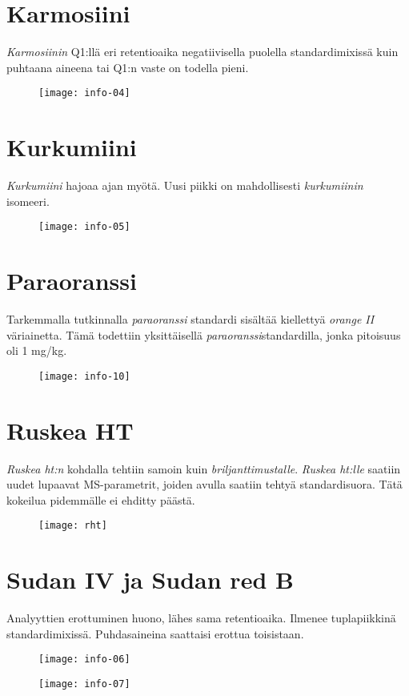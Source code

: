 \section{Karmosiini}
\textit{Karmosiinin} Q1:llä eri retentioaika negatiivisella puolella standardimixissä kuin puhtaana aineena tai Q1:n vaste on todella pieni.
\begin{figure}[!htbp]
  \centering
    \texttt{[image: info-04]}
\end{figure}
\clearpage
\section{Kurkumiini}
\textit{Kurkumiini} hajoaa ajan myötä. Uusi piikki on mahdollisesti \textit{kurkumiinin} isomeeri.
\begin{figure}[!htbp]
  \centering
    \texttt{[image: info-05]}
\end{figure}
\clearpage
\section{Paraoranssi}
Tarkemmalla tutkinnalla \textit{paraoranssi} standardi sisältää kiellettyä \textit{orange II} väriainetta. Tämä todettiin yksittäisellä \textit{paraoranssi}standardilla, jonka pitoisuus oli 1 mg/kg.
\begin{figure}[!htbp]
  \centering
    \texttt{[image: info-10]}
\end{figure}
\clearpage
\section{Ruskea HT}
\textit{Ruskea ht:n} kohdalla tehtiin samoin kuin \textit{briljanttimustalle}. \textit{Ruskea ht:lle} saatiin uudet lupaavat MS-parametrit, joiden avulla saatiin tehtyä standardisuora. Tätä kokeilua pidemmälle ei ehditty päästä.
\begin{figure}[!htbp]
  \centering
    \texttt{[image: rht]}
\end{figure}
\clearpage
\section{Sudan IV ja Sudan red B}
Analyyttien erottuminen huono, lähes sama retentioaika. Ilmenee tuplapiikkinä standardimixissä. Puhdasaineina saattaisi erottua toisistaan.
\begin{figure}[!htbp]
  \centering
    \texttt{[image: info-06]}
\end{figure}
\begin{figure}[!htbp]
  \centering
    \texttt{[image: info-07]}
\end{figure}
\clearpage

